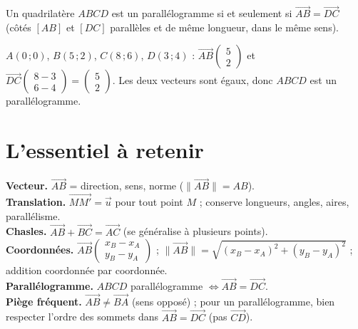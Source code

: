\begin{propriete}
Un quadrilatère $ABCD$ est un parallélogramme si et seulement si $\vec{AB}=\vec{DC}$
(côtés $[AB]$ et $[DC]$ parallèles et de même longueur, dans le même sens).
\end{propriete}

\begin{exemple}
$A(0\,;0)$, $B(5\,;2)$, $C(8\,;6)$, $D(3\,;4)$ : $\vec{AB}\begin{pmatrix}5\\2\end{pmatrix}$
et $\vec{DC}\begin{pmatrix}8-3\\6-4\end{pmatrix}=\begin{pmatrix}5\\2\end{pmatrix}$. Les deux
vecteurs sont égaux, donc $ABCD$ est un parallélogramme.
\end{exemple}

\section{L'essentiel à retenir}

\begin{synthese}
\textbf{Vecteur.} $\vec{AB}$ = direction, sens, norme ($\|\vec{AB}\|=AB$).\\[4pt]
\textbf{Translation.} $\vec{MM'}=\vec u$ pour tout point $M$ ; conserve longueurs, angles,
aires, parallélisme.\\[4pt]
\textbf{Chasles.} $\vec{AB}+\vec{BC}=\vec{AC}$ (se généralise à plusieurs points).\\[4pt]
\textbf{Coordonnées.} $\vec{AB}\begin{pmatrix}x_B-x_A\\y_B-y_A\end{pmatrix}$ ;
$\|\vec{AB}\|=\sqrt{(x_B-x_A)^{2}+(y_B-y_A)^{2}}$ ; addition coordonnée par coordonnée.\\[4pt]
\textbf{Parallélogramme.} $ABCD$ parallélogramme $\iff\vec{AB}=\vec{DC}$.\\[4pt]
\textbf{Piège fréquent.} $\vec{AB}\ne\vec{BA}$ (sens opposé) ; pour un parallélogramme,
bien respecter l'ordre des sommets dans $\vec{AB}=\vec{DC}$ (pas $\vec{CD}$).
\end{synthese}


